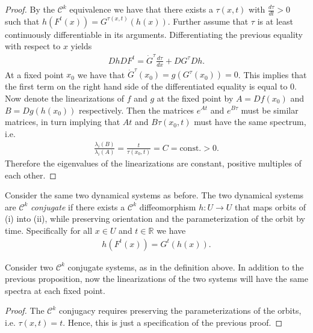 \begin{proof}
	By the $\mathcal{C}^k$ equivalence we have that there exists a $\tau (x,t)$ with $\frac{d \tau}{d t}>0$ such that $h(F^{t}(x)) = G^{\tau(x,t)}(h(x))$. Further assume that $\tau$ is at least continuously differentiable in its arguments. Differentiating the previous equality with respect to  $x$ yields
	\begin{align}
		Dh DF^{t} = \dot{G}^{\tau }\frac{d \tau }{dx} + D G^{\tau} Dh.
	\end{align}
	At a fixed point $x_0$ we have that $\dot{G}^{\tau}(x_0)=g(G^{\tau}(x_0))=0$. This implies that the first term on the right hand side of the differentiated equality is equal to 0. Now denote the linearizations of $f$ and $g$ at the fixed point by $A=Df(x_0)$ and $B=Dg(h(x_0))$ respectively. Then the matrices $e^{A t} $ and $e^{B\tau} $ must be similar matrices, in turn implying that $ At$ and $B\tau(x_0,t)$ must have the same spectrum, i.e.
	\begin{align}
		\frac{\lambda_i(B)}{\lambda_i(A)} = \frac{t}{\tau(x_0,t)} = C =  \textrm{const.}  >0. 
	\end{align}
Therefore the eigenvalues of the linearizations are constant, positive multiples	of each other.
\end{proof}


\begin{definition}
	Consider the same two dynamical systems as before. The two dynamical systems are $\mathcal{C}^k$ \emph{conjugate} if there exists a $\mathcal{C}^k$ diffeomorphism $h:U \to U$ that maps orbits of (i) into (ii), while preserving orientation and the parameterization of the orbit by time. Specifically for all $x \in U$ and $t \in \mathbb{R}$ we have
	\begin{align}
		\boxed{
			h(F^{t}(x)) = G^{t}(h(x)).
		}
	\end{align}
\end{definition}

\begin{proposition}
	Consider two $\mathcal{C}^{k}$ conjugate systems, as in the definition above. In addition to the previous proposition, now the linearizations of the two systems will have the same spectra at each fixed point.
\end{proposition}
\begin{proof}
	The $\mathcal{C}^{k}$ conjugacy requires preserving the parameterizations of the orbits, i.e. $\tau(x,t) = t$. Hence, this is just a specification of the previous proof.
\end{proof}


